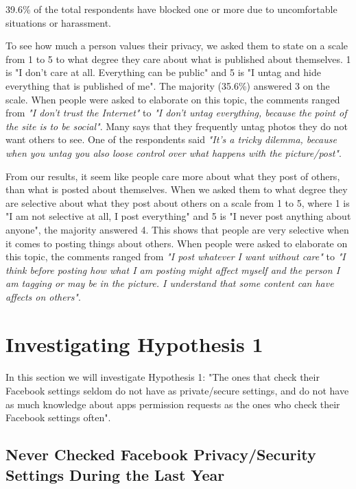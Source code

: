 39.6\% of the total respondents have blocked one or more due to uncomfortable situations or harassment. 

To see how much a person values their privacy, we asked them to state on a scale from 1 to 5 to what degree they care about what is published about themselves. 1 is "I don't care at all. Everything can be public" and 5 is "I untag and hide everything that is published of me". The majority (35.6\%) answered 3 on the scale.  When people were asked to elaborate on this topic, the comments ranged from \textit{"I don't trust the Internet"} to \textit{"I don't untag everything, because the point of the site is to be social"}. Many says that they frequently untag photos they do not want others to see. One of the respondents said \textit{"It's a tricky dilemma, because when you untag you also loose control over what happens with the picture/post"}.

From our results, it seem like people care more about what they post of others, than what is posted about themselves. When we asked them to what degree they are selective about what they post about others on a scale from 1 to 5, where 1 is "I am not selective at all, I post everything" and 5 is "I never post anything about anyone", the majority answered 4. This shows that people are very selective when it comes to posting things about others. When people were asked to elaborate on this topic, the comments ranged from \textit{"I post whatever I want without care"} to \textit{"I think before posting how what I am posting might affect myself and the person I am tagging or may be in the picture. I understand that some content can have affects on others"}.

\section{Investigating Hypothesis 1}

\paragraph{}
In this section we will investigate Hypothesis 1: "The ones that check their Facebook settings seldom do not have as private/secure settings, and do not have as much knowledge about apps permission requests as the ones who check their Facebook settings often".


\subsection{Never Checked Facebook Privacy/Security Settings During the Last Year}

